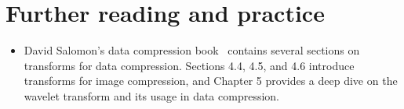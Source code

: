 




\section*{Further reading and practice}

\begin{itemize}
\item David Salomon's data compression book~\cite{salomon_compression_complete} contains several sections on transforms for data compression. Sections 4.4, 4.5, and 4.6 introduce transforms for image compression, and Chapter 5 provides a deep dive on the wavelet transform and its usage in data compression.
\end{itemize}
\vspace{0.25cm}

